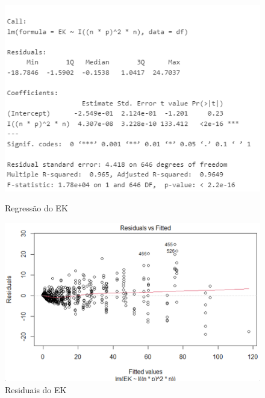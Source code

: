 \documentclass{uofa-eng-assignment}
\begin{document}
\vspace{0.1\linewidth}
\begin{figure}[h]
    \centering
    \begin{minipage}{0.45\textwidth}
        \centering
        \includegraphics[width=1\textwidth]{lm ek 1.png}
        \caption{Regressão do EK}
        \label{fig:ek-regression-2}
    \end{minipage}
    \hfill
    \begin{minipage}{0.45\textwidth}
        \centering
        \includegraphics[width=1\textwidth]{residuals-ek.png}
        \caption{Residuais do EK}
        \label{fig:ek-residuals}
    \end{minipage}
\end{figure}





\WFclear
\newpage
\end{document}
